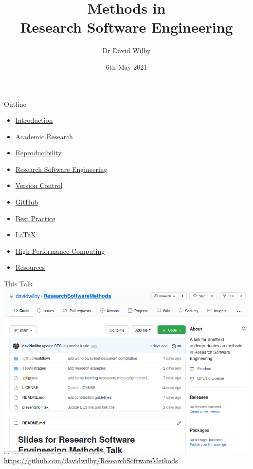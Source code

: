 \documentclass{beamer} %
\title{Methods in \\Research Software Engineering}
\date{6th May 2021}
\author{Dr David Wilby}
\institute{\href{https://rse.shef.ac.uk}{Research Software Engineering Team},\\ The University of Sheffield}
\begin{document}
  \begin{frame}
    \titlepage
  \end{frame}

  \begin{frame}{Outline}
    \begin{itemize}
      \item \hyperlink{INTRO}{Introduction}
      \item \hyperlink{RESEARCH}{Academic Research}
      \item \hyperlink{REPRO}{Reproducibility}
      \item \hyperlink{RSE}{Research Software Engineering}
      \item \hyperlink{GIT}{Version Control}
      \item \hyperlink{GITHUB}{GitHub}
      \item \hyperlink{BESTPRAC}{Best Practice}
      \item \hyperlink{LATEX}{LaTeX}
      \item \hyperlink{HPC}{High-Performance Computing}
      \item \hyperlink{RESOURCES}{Resources}
    \end{itemize}
  \end{frame}

  \begin{frame}[label=INTRO]{This Talk}
    \href{https://github.com/davidwilby/ResearchSoftwareMethods}{\includegraphics[width=\textwidth]{talk_repo_screenshot.png}}
    \url{https://github.com/davidwilby/ResearchSoftwareMethods}
  \end{frame}
\end{document}
